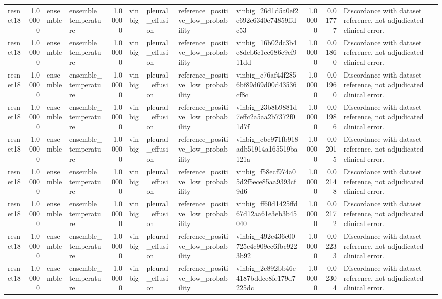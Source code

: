 \begin{tabular}{lrllrllllrrl}
resnet18 & 1.00000 & ensemble & ensemble\_temperature & 1.00000 & vinbig & pleural\_effusion & reference\_positive\_low\_probability & vinbig\_26d1d5a0ef2e692c6340e74859ffdc53 & 1.00000 & 0.01777 & Discordance with dataset reference, not adjudicated clinical error. \\
resnet18 & 1.00000 & ensemble & ensemble\_temperature & 1.00000 & vinbig & pleural\_effusion & reference\_positive\_low\_probability & vinbig\_16b02dc3b4e8deb6c1cc686c9ef911dd & 1.00000 & 0.01860 & Discordance with dataset reference, not adjudicated clinical error. \\
resnet18 & 1.00000 & ensemble & ensemble\_temperature & 1.00000 & vinbig & pleural\_effusion & reference\_positive\_low\_probability & vinbig\_e76af44f2856bf89d69d00d43536cf8c & 1.00000 & 0.01960 & Discordance with dataset reference, not adjudicated clinical error. \\
resnet18 & 1.00000 & ensemble & ensemble\_temperature & 1.00000 & vinbig & pleural\_effusion & reference\_positive\_low\_probability & vinbig\_23b8b9881d7effc2a5aa2b7372f01d7f & 1.00000 & 0.01986 & Discordance with dataset reference, not adjudicated clinical error. \\
resnet18 & 1.00000 & ensemble & ensemble\_temperature & 1.00000 & vinbig & pleural\_effusion & reference\_positive\_low\_probability & vinbig\_cbc971fb918adb51914a165519ba121a & 1.00000 & 0.02015 & Discordance with dataset reference, not adjudicated clinical error. \\
resnet18 & 1.00000 & ensemble & ensemble\_temperature & 1.00000 & vinbig & pleural\_effusion & reference\_positive\_low\_probability & vinbig\_f58ecf974a05d2f5ece85aa9393cf9d6 & 1.00000 & 0.02148 & Discordance with dataset reference, not adjudicated clinical error. \\
resnet18 & 1.00000 & ensemble & ensemble\_temperature & 1.00000 & vinbig & pleural\_effusion & reference\_positive\_low\_probability & vinbig\_ff60d1425ffd67d12aa61e3eb3b45040 & 1.00000 & 0.02172 & Discordance with dataset reference, not adjudicated clinical error. \\
resnet18 & 1.00000 & ensemble & ensemble\_temperature & 1.00000 & vinbig & pleural\_effusion & reference\_positive\_low\_probability & vinbig\_492c436c00725c4c909ec6fbc9223b92 & 1.00000 & 0.02233 & Discordance with dataset reference, not adjudicated clinical error. \\
resnet18 & 1.00000 & ensemble & ensemble\_temperature & 1.00000 & vinbig & pleural\_effusion & reference\_positive\_low\_probability & vinbig\_2c892bb46e4187bddce8fe179d7225dc & 1.00000 & 0.02304 & Discordance with dataset reference, not adjudicated clinical error. \\

\end{tabular}
